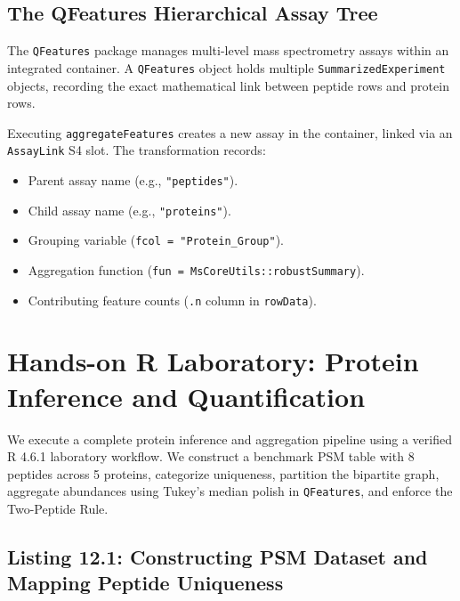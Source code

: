 \documentclass[11pt,twoside,openright]{book}
\begin{document}
\subsection{The QFeatures Hierarchical Assay Tree}
The \texttt{QFeatures} package \cite{gatto2023qfeatures, vanderaa2021reproducible, gatto2023psmatch} manages multi-level mass spectrometry assays within an integrated container. A \texttt{QFeatures} object holds multiple \texttt{SummarizedExperiment} objects, recording the exact mathematical link between peptide rows and protein rows.

Executing \texttt{aggregateFeatures} creates a new assay in the container, linked via an \texttt{AssayLink} S4 slot. The transformation records:
\begin{itemize}
    \item Parent assay name (e.g., \texttt{"peptides"}).
    \item Child assay name (e.g., \texttt{"proteins"}).
    \item Grouping variable (\texttt{fcol = "Protein\_Group"}).
    \item Aggregation function (\texttt{fun = MsCoreUtils::robustSummary}).
    \item Contributing feature counts (\texttt{.n} column in \texttt{rowData}).
\end{itemize}

\section{Hands-on R Laboratory: Protein Inference and Quantification}

We execute a complete protein inference and aggregation pipeline using a verified R 4.6.1 laboratory workflow. We construct a benchmark PSM table with 8 peptides across 5 proteins, categorize uniqueness, partition the bipartite graph, aggregate abundances using Tukey's median polish in \texttt{QFeatures}, and enforce the Two-Peptide Rule.

\subsection{Listing 12.1: Constructing PSM Dataset and Mapping Peptide Uniqueness}
\end{document}
